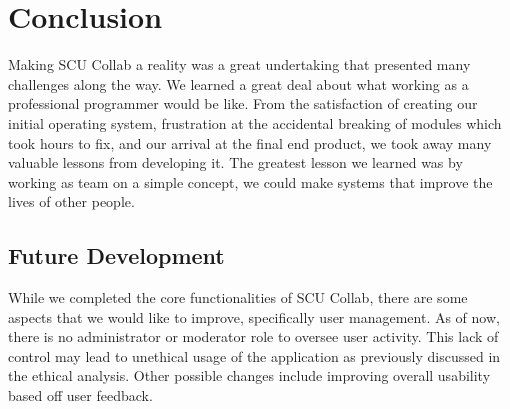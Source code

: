 \chapter{Conclusion}
Making SCU Collab a reality was a great undertaking that presented many challenges along the way. We learned a great deal about what working as a professional programmer would be like. From the satisfaction of creating our initial operating system, frustration at the accidental breaking of modules which took hours to fix, and our arrival at the final end product, we took away many valuable lessons from developing it. The greatest lesson we learned was by working as team on a simple concept, we could make systems that improve the lives of other people.

\section{Future Development}
While we completed the core functionalities of SCU Collab, there are some aspects that we would like to improve, specifically user management. As of now, there is no administrator or moderator role to oversee user activity. This lack of control may lead to unethical usage of the application as previously discussed in the ethical analysis. Other possible changes include improving overall usability based off user feedback.